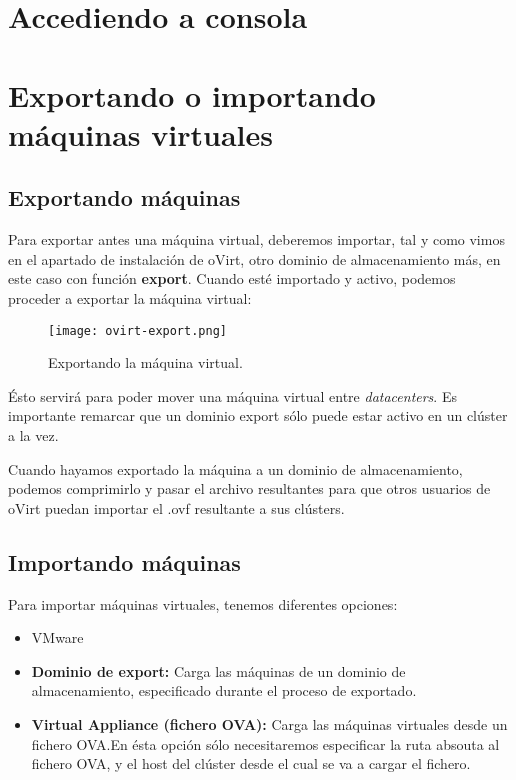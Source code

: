 \section{Accediendo a consola}
\label{sec:consola}

\section[Exportando / Importando]{Exportando o importando máquinas virtuales}
\label{sec:consola}

\subsection{Exportando máquinas}
\label{subsec:exportando}

Para exportar antes una máquina virtual, deberemos importar, tal y como vimos en el apartado de instalación de oVirt, otro dominio de almacenamiento más, en este caso con función \textbf{export}. Cuando esté importado y activo, podemos proceder a exportar la máquina virtual:

\begin{figure}[ht]
  \centering
  \texttt{[image: ovirt-export.png]}
  \caption{\label{fig:exportandovm} Exportando la máquina virtual.}
\end{figure}

Ésto servirá para poder mover una máquina virtual entre \emph{datacenters}. Es importante remarcar que un dominio export sólo puede estar activo en un clúster a la vez.

Cuando hayamos exportado la máquina a un dominio de almacenamiento, podemos comprimirlo y pasar el archivo resultantes para que otros usuarios de oVirt puedan importar el .ovf resultante a sus clústers.


\subsection{Importando máquinas}
\label{subsec:importando}

Para importar máquinas virtuales, tenemos diferentes opciones:

\begin{itemize}
\item VMware
\item \textbf{Dominio de export: } Carga las máquinas de un dominio de almacenamiento, especificado durante el proceso de exportado.
\item \textbf{Virtual Appliance (fichero OVA): } Carga las máquinas virtuales desde un fichero OVA.\@ En ésta opción sólo necesitaremos especificar la ruta absouta al fichero OVA, y el host del clúster desde el cual se va a cargar el fichero.
\end{itemize}

